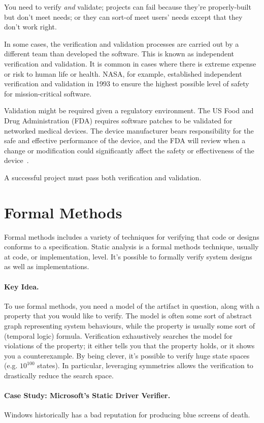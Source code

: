 You need to verify \emph{and} validate; projects can fail because they're
properly-built but don't meet needs; or they can sort-of meet users' needs
except that they don't work right.

In some cases, the verification and validation processes are carried out by a different team than developed the software. This is known as independent verification and validation. It is common in cases where there is extreme expense or risk to human life or health. NASA, for example, established independent verification and validation in 1993 to ensure the highest possible level of safety for mission-critical software. 

Validation might be required given a regulatory environment. The US Food and Drug Administration (FDA) requires software patches to be validated for networked medical devices. The device manufacturer bears responsibility for the safe and effective performance of the device, and the FDA will review when a change or modification could significantly affect the safety or effectiveness of the device~\cite{fda}. 

A successful project must pass both verification and validation.


\section*{Formal Methods}
Formal methods includes a variety of techniques for verifying that
code or designs conforms to a specification. Static analysis is a
formal methods technique, usually at code, or implementation,
level. It's possible to formally verify system designs as well as
implementations.

\paragraph{Key Idea.} To use formal methods, you need a model of the
artifact in question, along with a property that you would like to
verify. The model is often some sort of abstract graph representing
system behaviours, while the property is usually some sort of
(temporal logic) formula. Verification exhaustively
searches the model for violations of the property; it either tells
you that the property holds, or it shows you a counterexample.
By being clever, it's possible to verify huge state spaces
(e.g. $10^{100}$ states). In particular, leveraging symmetries allows
the verification to drastically reduce the search space.

\paragraph{Case Study: Microsoft's Static Driver Verifier.} 
Windows historically has a bad reputation for producing blue screens of death.

